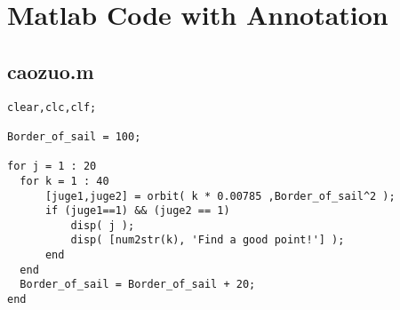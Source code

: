 \documentclass[../Paper.tex]{subfiles}
\begin{document}
\appendix

\section{Matlab Code with Annotation}
\subsection{caozuo.m}
\begin{verbatim}
clear,clc,clf;

Border_of_sail = 100;

for j = 1 : 20
  for k = 1 : 40
      [juge1,juge2] = orbit( k * 0.00785 ,Border_of_sail^2 );
      if (juge1==1) && (juge2 == 1)
          disp( j );
          disp( [num2str(k), 'Find a good point!'] );
      end
  end
  Border_of_sail = Border_of_sail + 20;
end

\end{verbatim}
\end{document}
